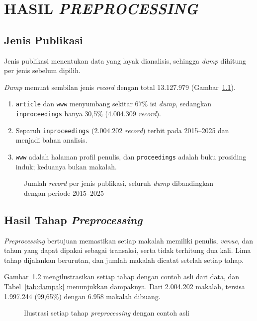 \chapter{HASIL \textit{PREPROCESSING}}
\label{chap:prepro}

\section{Jenis Publikasi}
\label{sec:hasil-jenis}
Jenis publikasi menentukan data yang layak dianalisis, sehingga \textit{dump} dihitung per jenis sebelum dipilih.

\textit{Dump} memuat sembilan jenis \textit{record} dengan total 13.127.979 (Gambar~\ref{fig:jenis}).
\begin{enumerate}
\item \texttt{article} dan \texttt{www} menyumbang sekitar 67\% isi \textit{dump}, sedangkan \texttt{inproceedings} hanya 30,5\% (4.004.309 \textit{record}).
\item Separuh \texttt{inproceedings} (2.004.202 \textit{record}) terbit pada 2015--2025 dan menjadi bahan analisis.
\item \texttt{www} adalah halaman profil penulis, dan \texttt{proceedings} adalah buku prosiding induk; keduanya bukan makalah.
\end{enumerate}

\begin{figure}[!htb]
\centering
{}
\caption{Jumlah \textit{record} per jenis publikasi, seluruh \textit{dump} dibandingkan dengan periode 2015--2025}
\label{fig:jenis}
\end{figure}

\section{Hasil Tahap \textit{Preprocessing}}
\label{sec:hasil-prepro}
\textit{Preprocessing} bertujuan memastikan setiap makalah memiliki penulis, \textit{venue}, dan tahun yang dapat dipakai sebagai transaksi, serta tidak terhitung dua kali. Lima tahap dijalankan berurutan, dan jumlah makalah dicatat setelah setiap tahap.

Gambar~\ref{fig:ilustrasi-prepro} mengilustrasikan setiap tahap dengan contoh asli dari data, dan Tabel~\ref{tab:dampak} menunjukkan dampaknya. Dari 2.004.202 makalah, tersisa 1.997.244 (99,65\%) dengan 6.958 makalah dibuang.

\begin{figure}[!htb]
\centering
{}
\caption{Ilustrasi setiap tahap \textit{preprocessing} dengan contoh asli}
\label{fig:ilustrasi-prepro}
\end{figure}

